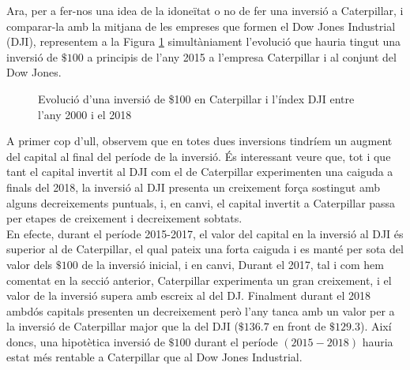 \documentclass{article}
\numberwithin{table}{section}
\numberwithin{figure}{section}
\numberwithin{equation}{section}
\begin{document}
Ara, per a fer-nos una idea de la idoneïtat o no de fer una inversió a Caterpillar, i comparar-la amb la mitjana de les empreses que formen el Dow Jones Industrial (DJI), representem a la Figura \ref{fig:inversio} simultàniament l'evolució que hauria tingut una inversió de $\$100$ a principis de l'any 2015 a l'empresa Caterpillar i al conjunt del Dow Jones.
\begin{figure}[H]
\centering \sffamily \small

\caption{Evolució d'una inversió de \$100 en Caterpillar i l'índex DJI entre l'any 2000 i el 2018}
\label{fig:inversio}
\end{figure}

A primer cop d'ull, observem que en totes dues inversions tindríem un augment del capital al final del període de la inversió. És interessant veure que, tot i que tant el capital invertit al DJI com el de Caterpillar experimenten una caiguda a finals del 2018, la inversió al DJI presenta un creixement força sostingut amb alguns decreixements puntuals, i, en canvi, el capital invertit a Caterpillar passa per etapes de creixement i decreixement sobtats.\\
En efecte, durant el període 2015-2017, el valor del capital en la inversió al DJI és superior al de Caterpillar, el qual pateix una forta caiguda i es manté per sota del valor dels $\$100$ de la inversió inicial, i en canvi, Durant el 2017, tal i com hem comentat en la secció anterior, Caterpillar experimenta un gran creixement, i el valor de la inversió supera amb escreix al del DJ. Finalment durant el 2018 ambdós capitals presenten un decreixement però l'any tanca amb un valor per a la inversió de Caterpillar major que la del DJI  ($\$136.7$ en front de  $\$129.3$). Així doncs, una hipotètica inversió de $\$100$ durant el període $(2015-2018)$ hauria estat més rentable a Caterpillar que al Dow Jones Industrial.
\end{document}
